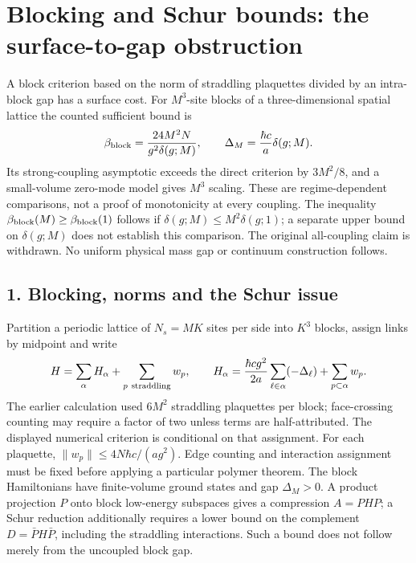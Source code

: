 \documentclass[11pt,a4paper]{article}
\begin{document}
\hypertarget{blocking-and-schur-bounds-the-surface-to-gap-obstruction}{%
\section{Blocking and Schur bounds: the surface-to-gap
obstruction}\label{blocking-and-schur-bounds-the-surface-to-gap-obstruction}}

A block criterion based on the norm of straddling plaquettes divided by
an intra-block gap has a surface cost. For \(M^3\)-site blocks of a
three-dimensional spatial lattice the counted sufficient bound is
\[\beta_{\rm block}=\frac{24M^2N}{g^2\delta(g;M)},\qquad
\Delta_M=\frac{\hbar c}{a}\delta(g;M).\] Its strong-coupling asymptotic
exceeds the direct criterion by \(3M^2/8\), and a small-volume zero-mode
model gives \(M^3\) scaling. These are regime-dependent comparisons, not
a proof of monotonicity at every coupling. The inequality
\(\beta_{\rm block}(M)\ge\beta_{\rm block}(1)\) follows if
\(\delta(g;M)\le M^2\delta(g;1)\); a separate upper bound on
\(\delta(g;M)\) does not establish this comparison. The original
all-coupling claim is withdrawn. No uniform physical mass gap or
continuum construction follows.

\hypertarget{blocking-norms-and-the-schur-issue}{%
\subsection{1. Blocking, norms and the Schur
issue}\label{blocking-norms-and-the-schur-issue}}

Partition a periodic lattice of \(N_s=MK\) sites per side into \(K^3\)
blocks, assign links by midpoint and write
\[H=\sum_\alpha H_\alpha+\sum_{p\ {\rm straddling}}w_p,\qquad
H_\alpha=\frac{\hbar cg^2}{2a}\sum_{\ell\in\alpha}(-\Delta_\ell)
+\sum_{p\subset\alpha}w_p.\] The earlier calculation used \(6M^2\)
straddling plaquettes per block; face-crossing counting may require a
factor of two unless terms are half-attributed. The displayed numerical
criterion is conditional on that assignment. For each plaquette,
\(\|w_p\|\le4N\hbar c/(ag^2)\). Edge counting and interaction assignment
must be fixed before applying a particular polymer theorem. The block
Hamiltonians have finite-volume ground states and gap \(\Delta_M>0\). A
product projection \(P\) onto block low-energy subspaces gives a
compression \(A=PHP\); a Schur reduction additionally requires a lower
bound on the complement \(D=\bar PH\bar P\), including the straddling
interactions. Such a bound does not follow merely from the uncoupled
block gap.
\end{document}
